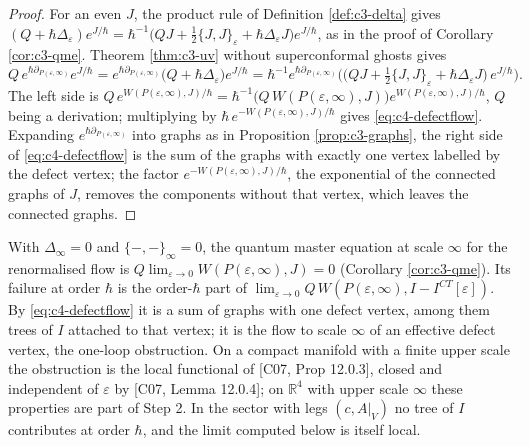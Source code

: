 \begin{proof}
For an even $J$, the product rule of Definition \ref{def:c3-delta} gives $(Q+\hbar\Delta_\varepsilon)e^{J/\hbar}=\hbar^{-1}\big(QJ+\tfrac12\{J,J\}_\varepsilon+\hbar\Delta_\varepsilon J\big)e^{J/\hbar}$, as in the proof of Corollary \ref{cor:c3-qme}. Theorem \ref{thm:c3-uv} without superconformal ghosts gives
\[
Q\,e^{\hbar\partial_{P(\varepsilon,\infty)}}e^{J/\hbar}=e^{\hbar\partial_{P(\varepsilon,\infty)}}\big(Q+\hbar\Delta_\varepsilon\big)e^{J/\hbar}=\hbar^{-1}e^{\hbar\partial_{P(\varepsilon,\infty)}}\Big(\big(QJ+\tfrac12\{J,J\}_\varepsilon+\hbar\Delta_\varepsilon J\big)\,e^{J/\hbar}\Big).
\]
The left side is $Q\,e^{W(P(\varepsilon,\infty),J)/\hbar}=\hbar^{-1}\big(Q\,W(P(\varepsilon,\infty),J)\big)e^{W(P(\varepsilon,\infty),J)/\hbar}$, $Q$ being a derivation; multiplying by $\hbar\,e^{-W(P(\varepsilon,\infty),J)/\hbar}$ gives \eqref{eq:c4-defectflow}. Expanding $e^{\hbar\partial_{P(\varepsilon,\infty)}}$ into graphs as in Proposition \ref{prop:c3-graphs}, the right side of \eqref{eq:c4-defectflow} is the sum of the graphs with exactly one vertex labelled by the defect vertex; the factor $e^{-W(P(\varepsilon,\infty),J)/\hbar}$, the exponential of the connected graphs of $J$, removes the components without that vertex, which leaves the connected graphs.
\end{proof}

With $\Delta_\infty=0$ and $\{-,-\}_\infty=0$, the quantum master equation at scale $\infty$ for the renormalised flow is $Q\lim_{\varepsilon\to0}W(P(\varepsilon,\infty),J)=0$ (Corollary \ref{cor:c3-qme}). Its failure at order $\hbar$ is the order-$\hbar$ part of $\lim_{\varepsilon\to0}Q\,W(P(\varepsilon,\infty),I-I^{CT}[\varepsilon])$. By \eqref{eq:c4-defectflow} it is a sum of graphs with one defect vertex, among them trees of $I$ attached to that vertex; it is the flow to scale $\infty$ of an effective defect vertex, the one-loop obstruction. On a compact manifold with a finite upper scale the obstruction is the local functional of [C07, Prop 12.0.3], closed and independent of $\varepsilon$ by [C07, Lemma 12.0.4]; on $\mathbb R^4$ with upper scale $\infty$ these properties are part of Step 2. In the sector with legs $(c,A|_V)$ no tree of $I$ contributes at order $\hbar$, and the limit computed below is itself local.

